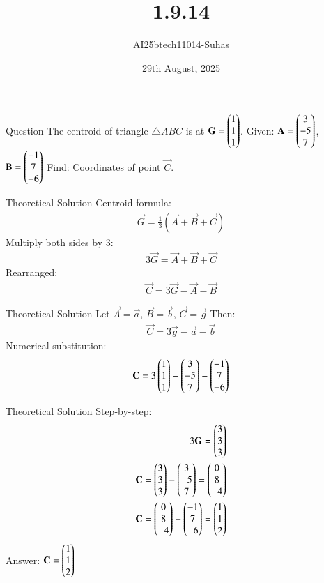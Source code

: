 \documentclass{beamer}
\title{1.9.14}
\date{29th August, 2025}
\author{AI25btech11014-Suhas}
\begin{document}
\frame{\titlepage}

\begin{frame}{Question}
The centroid of triangle $\triangle ABC$ is at $\vec{G} = \myvec{1\\1\\1}$.  
Given:  
$\vec{A} = \myvec{3\\-5\\7}$,  
$\vec{B} = \myvec{-1\\7\\-6}$  
Find: Coordinates of point $\vec{C}$.
\end{frame}

\begin{frame}{Theoretical Solution}
Centroid formula:  
\begin{align}
\vec{G} = \frac{1}{3}(\vec{A} + \vec{B} + \vec{C})
\end{align}
Multiply both sides by 3:  
\begin{align}
3\vec{G} = \vec{A} + \vec{B} + \vec{C}
\end{align}
Rearranged:  
\begin{align}
\vec{C} = 3\vec{G} - \vec{A} - \vec{B}
\end{align}
\end{frame}

\begin{frame}{Theoretical Solution}
Let $\vec{A} = \vec{a}$, $\vec{B} = \vec{b}$, $\vec{G} = \vec{g}$  
Then:  
\begin{align}
\vec{C} = 3\vec{g} - \vec{a} - \vec{b}
\end{align}
Numerical substitution:  
\begin{align}
\vec{C} = 3\myvec{1\\1\\1} - \myvec{3\\-5\\7} - \myvec{-1\\7\\-6}
\end{align}
\end{frame}

\begin{frame}{Theoretical Solution}
Step-by-step:  
\begin{align}
3\vec{G} = \myvec{3\\3\\3} \\
\vec{C} = \myvec{3\\3\\3} - \myvec{3\\-5\\7} = \myvec{0\\8\\-4} \\
\vec{C} = \myvec{0\\8\\-4} - \myvec{-1\\7\\-6} = \myvec{1\\1\\2}
\end{align}
Answer:  
$\vec{C} = \myvec{1\\1\\2}$
\end{frame}
\end{document}
